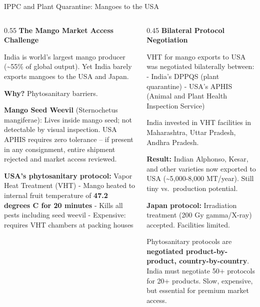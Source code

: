 \documentclass[
  ignorenonframetext,
  aspectratio=169,
]{beamer}
\makeatletter
\let\quarto@originallabel\label
\DeclareRobustCommand*{\label}[1]{\quarto@originallabel{#1}}
\makeatother
\begin{document}
\begin{frame}{IPPC and Plant Quarantine: Mangoes to the USA}
\label{ippc-and-plant-quarantine-mangoes-to-the-usa}
\begin{columns}[T]
\begin{column}{0.55\linewidth}
\textbf{The Mango Market Access Challenge}

India is world's largest mango producer (\textasciitilde55\% of global
output). Yet India barely exports mangoes to the USA and Japan.

\textbf{Why?} Phytosanitary barriers.

\textbf{Mango Seed Weevil} (Sternochetus mangiferae): Lives inside mango
seed; not detectable by visual inspection. USA APHIS requires zero
tolerance -- if present in any consignment, entire shipment rejected and
market access reviewed.

\textbf{USA's phytosanitary protocol:} Vapor Heat Treatment (VHT) -
Mango heated to internal fruit temperature of \textbf{47.2 degrees C for
20 minutes} - Kills all pests including seed weevil - Expensive:
requires VHT chambers at packing houses
\end{column}

\begin{column}{0.45\linewidth}
\textbf{Bilateral Protocol Negotiation}

VHT for mango exports to USA was negotiated bilaterally between: -
India's DPPQS (plant quarantine) - USA's APHIS (Animal and Plant Health
Inspection Service)

India invested in VHT facilities in Maharashtra, Uttar Pradesh, Andhra
Pradesh.

\textbf{Result:} Indian Alphonso, Kesar, and other varieties now
exported to USA (\textasciitilde5,000-8,000 MT/year). Still tiny
vs.~production potential.

\textbf{Japan protocol:} Irradiation treatment (200 Gy gamma/X-ray)
accepted. Facilities limited.

Phytosanitary protocols are \textbf{negotiated product-by-product,
country-by-country}. India must negotiate 50+ protocols for 20+
products. Slow, expensive, but essential for premium market access.
\end{column}
\end{columns}
\end{frame}
\end{document}

